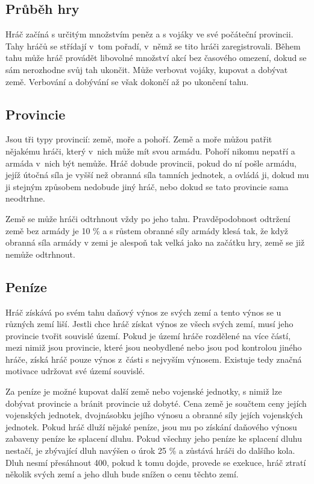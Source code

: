 \documentclass[a4paper,12pt]{article}
\begin{document}
\subsection{Průběh hry}
Hráč začíná s určitým množstvím peněz a s vojáky ve své počáteční provincii. Tahy hráčů se střídají v~tom pořadí, v~němž se tito hráči zaregistrovali. Během tahu může hráč provádět libovolné množství akcí bez časového omezení, dokud se sám nerozhodne svůj tah ukončit. Může verbovat vojáky, kupovat a dobývat země. Verbování a dobývání se však dokončí až po ukončení tahu.
\subsection{Provincie}
Jsou tři typy provincií: země, moře a pohoří. Země a moře můžou patřit nějakému hráči, který v~nich může mít svou armádu. Pohoří nikomu nepatří a armáda v~nich být nemůže. Hráč dobude provincii, pokud do ní pošle armádu, jejíž útočná síla je vyšší než obranná síla tamních jednotek, a ovládá ji, dokud mu ji stejným způsobem nedobude jiný hráč, nebo dokud se tato provincie sama neodtrhne.

Země se může hráči odtrhnout vždy po jeho tahu. Pravděpodobnost odtržení země bez armády je 10 \% a s růstem obranné síly armády klesá tak, že když obranná síla armády v zemi je alespoň tak velká jako na začátku hry, země se již nemůže odtrhnout.
\subsection{Peníze}
Hráč získává po svém tahu daňový výnos ze svých zemí a tento výnos se u různých zemí liší. Jestli chce hráč získat výnos ze všech svých zemí, musí jeho provincie tvořit souvislé území. Pokud je území hráče rozdělené na více částí, mezi nimiž jsou provincie, které jsou neobydlené nebo jsou pod kontrolou jiného hráče, získá hráč pouze výnos z~části s nejvyším výnosem. Existuje tedy značná motivace udržovat své území souvislé.

Za peníze je možné kupovat další země nebo vojenské jednotky, s nimiž lze dobývat provincie a bránit provincie už dobyté. Cena země je součtem ceny jejích vojenských jednotek, dvojnásobku jejího výnosu a obranné síly jejích vojenských jednotek. Pokud hráč dluží nějaké peníze, jsou mu po získání daňového výnosu zabaveny peníze ke splacení dluhu. Pokud všechny jeho peníze ke splacení dluhu nestačí, je zbývající dluh navýšen o úrok 25 \% a zůstává hráči do dalšího kola. Dluh nesmí přesáhnout 400, pokud k tomu dojde, provede se exekuce, hráč ztratí několik svých zemí a jeho dluh bude snížen o cenu těchto zemí.
\end{document}
